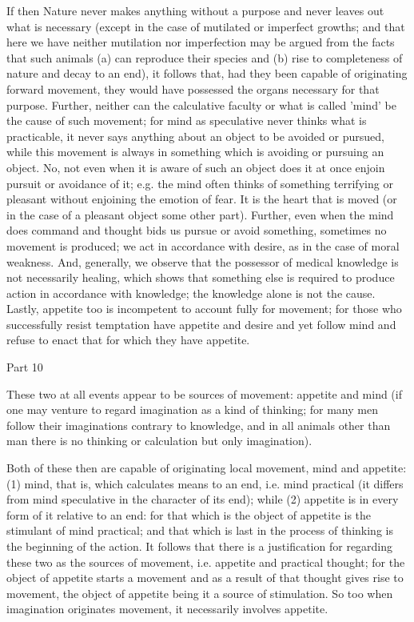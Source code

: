 If then Nature never makes anything without a purpose and never leaves
out what is necessary (except in the case of mutilated or imperfect
growths; and that here we have neither mutilation nor imperfection
may be argued from the facts that such animals (a) can reproduce their
species and (b) rise to completeness of nature and decay to an end),
it follows that, had they been capable of originating forward movement,
they would have possessed the organs necessary for that purpose. Further,
neither can the calculative faculty or what is called 'mind' be the
cause of such movement; for mind as speculative never thinks what
is practicable, it never says anything about an object to be avoided
or pursued, while this movement is always in something which is avoiding
or pursuing an object. No, not even when it is aware of such an object
does it at once enjoin pursuit or avoidance of it; e.g. the mind often
thinks of something terrifying or pleasant without enjoining the emotion
of fear. It is the heart that is moved (or in the case of a pleasant
object some other part). Further, even when the mind does command
and thought bids us pursue or avoid something, sometimes no movement
is produced; we act in accordance with desire, as in the case of moral
weakness. And, generally, we observe that the possessor of medical
knowledge is not necessarily healing, which shows that something else
is required to produce action in accordance with knowledge; the knowledge
alone is not the cause. Lastly, appetite too is incompetent to account
fully for movement; for those who successfully resist temptation have
appetite and desire and yet follow mind and refuse to enact that for
which they have appetite. 

Part 10

These two at all events appear to be sources of movement: appetite
and mind (if one may venture to regard imagination as a kind of thinking;
for many men follow their imaginations contrary to knowledge, and
in all animals other than man there is no thinking or calculation
but only imagination). 

Both of these then are capable of originating local movement, mind
and appetite: (1) mind, that is, which calculates means to an end,
i.e. mind practical (it differs from mind speculative in the character
of its end); while (2) appetite is in every form of it relative to
an end: for that which is the object of appetite is the stimulant
of mind practical; and that which is last in the process of thinking
is the beginning of the action. It follows that there is a justification
for regarding these two as the sources of movement, i.e. appetite
and practical thought; for the object of appetite starts a movement
and as a result of that thought gives rise to movement, the object
of appetite being it a source of stimulation. So too when imagination
originates movement, it necessarily involves appetite. 

